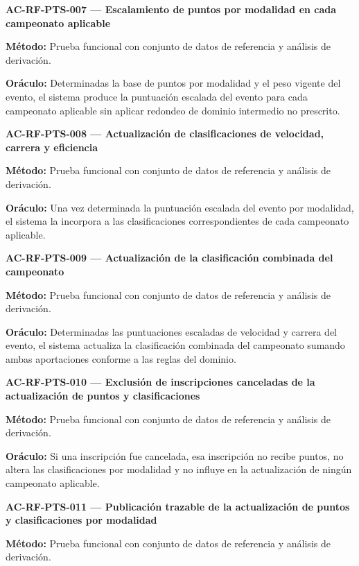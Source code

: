 \documentclass[10pt,letterpaper]{article}
\begin{document}
\noindent\textbf{AC-RF-PTS-007 --- Escalamiento de puntos por modalidad en cada campeonato aplicable}\par
\textbf{Método:} Prueba funcional con conjunto de datos de referencia y análisis de derivación.\par
\textbf{Oráculo:} Determinadas la base de puntos por modalidad y el peso vigente del evento, el sistema produce la puntuación escalada del evento para cada campeonato aplicable sin aplicar redondeo de dominio intermedio no prescrito.\par\vspace{0.45em}
\noindent\textbf{AC-RF-PTS-008 --- Actualización de clasificaciones de velocidad, carrera y eficiencia}\par
\textbf{Método:} Prueba funcional con conjunto de datos de referencia y análisis de derivación.\par
\textbf{Oráculo:} Una vez determinada la puntuación escalada del evento por modalidad, el sistema la incorpora a las clasificaciones correspondientes de cada campeonato aplicable.\par\vspace{0.45em}
\noindent\textbf{AC-RF-PTS-009 --- Actualización de la clasificación combinada del campeonato}\par
\textbf{Método:} Prueba funcional con conjunto de datos de referencia y análisis de derivación.\par
\textbf{Oráculo:} Determinadas las puntuaciones escaladas de velocidad y carrera del evento, el sistema actualiza la clasificación combinada del campeonato sumando ambas aportaciones conforme a las reglas del dominio.\par\vspace{0.45em}
\noindent\textbf{AC-RF-PTS-010 --- Exclusión de inscripciones canceladas de la actualización de puntos y clasificaciones}\par
\textbf{Método:} Prueba funcional con conjunto de datos de referencia y análisis de derivación.\par
\textbf{Oráculo:} Si una inscripción fue cancelada, esa inscripción no recibe puntos, no altera las clasificaciones por modalidad y no influye en la actualización de ningún campeonato aplicable.\par\vspace{0.45em}
\noindent\textbf{AC-RF-PTS-011 --- Publicación trazable de la actualización de puntos y clasificaciones por modalidad}\par
\textbf{Método:} Prueba funcional con conjunto de datos de referencia y análisis de derivación.\par
\end{document}
